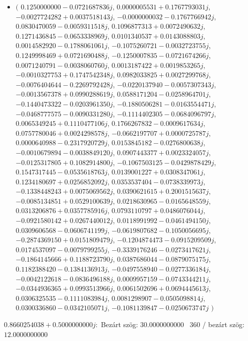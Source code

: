 \documentclass[14pt,a4paper]{article}
\begin{document}
\begin{itemize}
\item
$\big($
$0.1250000000-0.0721687836j$, $0.0000005531+0.1767793031j$, $-0.0027724282+0.0037518143j$, $-0.0000000032-0.1767766942j$, $0.0830470059-0.0059311518j$, $0.1096877313+0.0072490632j$, $0.1271436845-0.0653338969j$, $0.0101340537+0.0143088803j$, $0.0014582920-0.1788061061j$, $-0.1075260721-0.0032723755j$, $0.1249998469+0.0721690488j$, $-0.1250007835-0.0721674266j$, $0.0071240791-0.0038060760j$, $0.0013187422+0.0019853265j$, $-0.0010327753+0.1747542348j$, $0.0982033825+0.0027299768j$, $-0.0076404644-0.2269792428j$, $-0.0220137940-0.0057307343j$, $-0.0013567378+0.0990288619j$, $0.0588171204-0.0258964701j$, $-0.1440473322-0.0203961350j$, $-0.1880506281-0.0163554471j$, $-0.0468777575-0.0090331280j$, $-0.1114402305-0.0684096797j$, $0.0065349245+0.1110477106j$, $0.1766267832-0.0009617634j$, $0.0757780046+0.0024298578j$, $-0.0662197707+0.0000725787j$, $0.0000640988-0.2317920729j$, $0.0153845182-0.0276800638j$, $-0.0010679894-0.0038849120j$, $0.0907443377+0.0023324057j$, $-0.0125317805+0.1082914800j$, $-0.1067503125-0.0429878429j$, $0.1547317445-0.0535618763j$, $0.0139001227+0.0308347061j$, $0.1234180697+0.0256852092j$, $0.0353537404-0.0738339973j$, $-0.1338448243+0.0075069562j$, $0.0390621615+0.2001515637j$, $-0.0085134851+0.0529100639j$, $0.0218630965-0.0165648559j$, $0.0313206876+0.0357785916j$, $0.0793110797+0.0486076044j$, $-0.0921580142+0.0267440012j$, $0.0118991992-0.0461494150j$, $0.0309606568-0.0606741199j$, $-0.0619807682-0.1050056695j$, $-0.2874369150+0.0151809479j$, $-0.1204874473-0.0915209509j$, $0.0174537097-0.0079799255j$, $-0.3339176246-0.0273417621j$, $-0.1864145666+0.1188723790j$, $0.0387686044-0.0879075175j$, $0.1182388420-0.1384136913j$, $-0.0497558940-0.0277336184j$, $-0.0042122618-0.0836496188j$, $0.0009957159-0.0743344211j$, $-0.0344936365+0.0993513966j$, $0.0061502696+0.0694445613j$, $0.0306325535-0.1111083984j$, $0.0081298907-0.0505098814j$, $0.0300336860-0.0342105071j$, $-0.1081139847-0.0250673747j$
$\big)$
\end{itemize}
$0.8660254038+0.5000000000j$:\
Bezárt szög: $30.0000000000$ \
360 / bezárt szög: $12.0000000000$\
\end{document}
